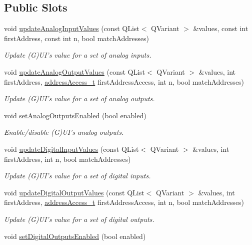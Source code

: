 \subsection*{Public Slots}
\begin{DoxyCompactItemize}
\item 
void \hyperlink{classmdt_device_ios_addeff0a2dab646a49170f8be10cc46fb}{updateAnalogInputValues} (const QList$<$ QVariant $>$ \&values, const int firstAddress, const int n, bool matchAddresses)
\begin{DoxyCompactList}\small\item\em Update (G)UI's value for a set of analog inputs. \end{DoxyCompactList}\item 
void \hyperlink{classmdt_device_ios_a3aee92ecadda601d9482aeb6419f0bb8}{updateAnalogOutputValues} (const QList$<$ QVariant $>$ \&values, int firstAddress, \hyperlink{classmdt_device_ios_a72fc3fdcd905d669b1e90496e808d6dd}{addressAccess\_\-t} firstAddressAccess, int n, bool matchAddresses)
\begin{DoxyCompactList}\small\item\em Update (G)UI's value for a set of analog outputs. \end{DoxyCompactList}\item 
\hypertarget{classmdt_device_ios_ae266924a427fbc896e5f9774890ec91f}{
void \hyperlink{classmdt_device_ios_ae266924a427fbc896e5f9774890ec91f}{setAnalogOutputsEnabled} (bool enabled)}
\label{classmdt_device_ios_ae266924a427fbc896e5f9774890ec91f}

\begin{DoxyCompactList}\small\item\em Enable/disable (G)UI's analog outputs. \end{DoxyCompactList}\item 
void \hyperlink{classmdt_device_ios_ae994a3ef4d4f101ac185308e4afc05cb}{updateDigitalInputValues} (const QList$<$ QVariant $>$ \&values, int firstAddress, int n, bool matchAddresses)
\begin{DoxyCompactList}\small\item\em Update (G)UI's value for a set of digital inputs. \end{DoxyCompactList}\item 
void \hyperlink{classmdt_device_ios_a06642814dbbb525dff7d1a7e603f57ac}{updateDigitalOutputValues} (const QList$<$ QVariant $>$ \&values, int firstAddress, \hyperlink{classmdt_device_ios_a72fc3fdcd905d669b1e90496e808d6dd}{addressAccess\_\-t} firstAddressAccess, int n, bool matchAddresses)
\begin{DoxyCompactList}\small\item\em Update (G)UI's value for a set of digital outputs. \end{DoxyCompactList}\item 
\hypertarget{classmdt_device_ios_ab1d98b31f7845c0015ac16728038d2db}{
void \hyperlink{classmdt_device_ios_ab1d98b31f7845c0015ac16728038d2db}{setDigitalOutputsEnabled} (bool enabled)}
\label{classmdt_device_ios_ab1d98b31f7845c0015ac16728038d2db}


\end{DoxyCompactItemize}
